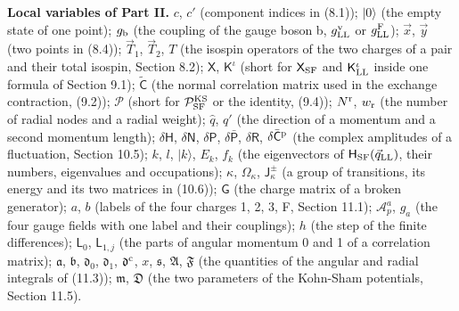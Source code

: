 \documentclass[
  10pt,
]{article}
\begin{document}
\textbf{Local variables of Part II.} \(c\), \(c'\) (component indices in
(8.1)); \(\lvert0\rangle\) (the empty state of one point); \(g_{\rm b}\)
(the coupling of the gauge boson b, \(g^{\rm v}_{\rm LL}\) or
\(g^{\rm F}_{\rm LL}\)); \(\vec x\), \(\vec y\) (two points in (8.4));
\(\vec T_1\), \(\vec T_2\), \(T\) (the isospin operators of the two
charges of a pair and their total isospin, Section 8.2); \(\mathsf X\),
\(\mathsf K^\iota\) (short for \(\mathsf X_{\rm SF}\) and
\(\mathsf K^\iota_{\rm LL}\) inside one formula of Section 9.1);
\(\tilde{\mathsf C}\) (the normal correlation matrix used in the
exchange contraction, (9.2)); \(\mathcal P\) (short for
\(\mathcal P^{\rm KS}_{\rm SF}\) or the identity, (9.4)); \(N^{\rm r}\),
\(w_{\rm r}\) (the number of radial nodes and a radial weight);
\(\hat q\), \(q'\) (the direction of a momentum and a second momentum
length); \(\delta\mathsf H\), \(\delta\mathsf N\), \(\delta\mathsf P\),
\(\delta\bar{\mathsf P}\), \(\delta\mathsf R\),
\(\delta\bar{\mathsf C}^{\rm p}\) (the complex amplitudes of a
fluctuation, Section 10.5); \(k\), \(l\), \(\lvert k\rangle\), \(E_k\),
\(f_k\) (the eigenvectors of \(\mathsf H_{\rm SF}(\vec q_{\rm LL})\),
their numbers, eigenvalues and occupations); \(\kappa\),
\(\Omega_\kappa\), \(\mathsf J^\pm_\kappa\) (a group of transitions, its
energy and its two matrices in (10.6)); \(\mathsf G\) (the charge matrix
of a broken generator); \(a\), \(b\) (labels of the four charges 1, 2,
3, F, Section 11.1); \(\mathcal A^a_p\), \(g_a\) (the four gauge fields
with one label and their couplings); \(h\) (the step of the finite
differences); \(\mathsf L_0\), \(\mathsf L_{1,j}\) (the parts of angular
momentum 0 and 1 of a correlation matrix); \(\mathfrak a\),
\(\mathfrak b\), \(\mathfrak d_0\), \(\mathfrak d_1\),
\(\mathfrak d^{\rm c}\), \(x\), \(\mathfrak s\), \(\mathfrak A\),
\(\mathfrak F\) (the quantities of the angular and radial integrals of
(11.3)); \(\mathfrak m\), \(\mathfrak D\) (the two parameters of the
Kohn-Sham potentials, Section 11.5).
\end{document}
